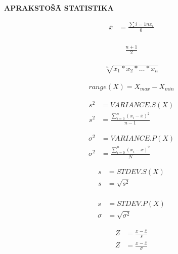\textbf{APRAKSTOŠĀ STATISTIKA}

{\begin{align*}
     \overline{x} &= \frac{\sum{i=1}{n}x_i}{0} \\
\end{align*}}

{\begin{align*}
    \frac{n+1}{2}
\end{align*}}

{\begin{align*}
    \sqrt[n]{x_1*x_2*\dots*x_n}
\end{align*}}

{\begin{align*}
    range(X)=X_{max}-X_{min}
\end{align*}}

{\begin{align*}
    s^2 &= VARIANCE.S(X) \\
    s^2 &= \frac{\sum_{i=0}^{n} (x_i-\overline{x})^2}{n-1}
\end{align*}}

{\begin{align*}
    \sigma^2 &= VARIANCE.P(X) \\
    \sigma^2 &= \frac{\sum_{i=0}^{n} (x_i-\overline{x})^2}{N}
\end{align*}}

{\begin{align*}
    s &= STDEV.S(X) \\
    s &= \sqrt{s^2} \\
\end{align*}}

{\begin{align*}
    s &= STDEV.P(X) \\
    \sigma &= \sqrt{\sigma^2}
\end{align*}}



{\begin{align*}
    Z &= \frac{x-\overline{x}}{s} \\
    Z &= \frac{x-\overline{x}}{\sigma}
\end{align*}}

